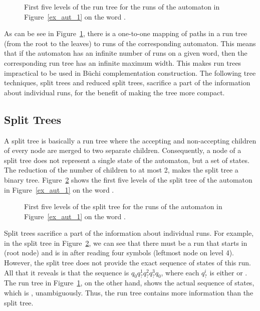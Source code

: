 \begin{figure}[htb]
\centering
\RunTree
\caption{First five levels of the run tree for the runs of the automaton in Figure~\ref{ex_aut_1} on the word \aom.}
\label{run_tree}
\end{figure}

As can be see in Figure~\ref{run_tree}, there is a one-to-one mapping of paths in a run tree (from the root to the leaves) to runs of the corresponding automaton. This means that if the automaton has an infinite number of runs on a given word, then the corresponding run tree has an infinite maximum width. This makes run trees impractical to be used in Büchi complementation construction. The following tree techniques, split trees and reduced split trees, sacrifice a part of the information about individual runs, for the benefit of making the tree more compact.

\subsection{Split Trees}
\label{2_split_trees}
A split tree is basically a run tree where the accepting and non-accepting children of every node are merged to two separate children. Consequently, a node of a split tree does not represent a single state of the automaton, but a set of states. The reduction of the number of children to at most 2, makes the split tree a binary tree. Figure~\ref{split_tree} shows the first five levels of the split tree of the automaton in Figure~\ref{ex_aut_1} on the word \aom.

\begin{figure}[htb]
\centering
\SplitTreeRightLeft
\caption{First five levels of the split tree for the runs of the automaton in Figure~\ref{ex_aut_1} on the word \aom.}
\label{split_tree}
\end{figure}

Split trees sacrifice a part of the information about individual runs. For example, in the split tree in Figure~\ref{split_tree}, we can see that there must be a run that starts in  (root node) and is in  after reading four symbols (leftmost node on level 4). However, the split tree does not provide the exact sequence of states of this run. All that it reveals is that the sequence is $q_{0}q^1_?q^2_?q^3_?q_{0}$, where each $q^i_?$ is either  or . The run tree in Figure~\ref{run_tree}, on the other hand, shows the actual sequence of states, which is , unambiguously. Thus, the run tree contains more information than the split tree.

